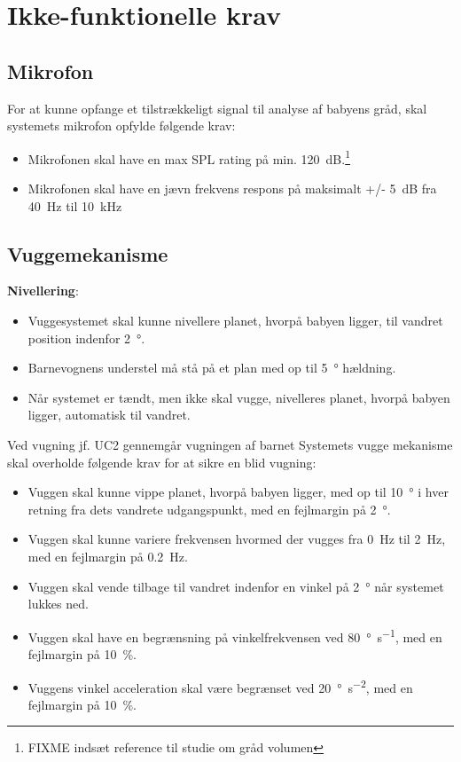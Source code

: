 \section{Ikke-funktionelle krav}

\subsection*{Mikrofon}
For at kunne opfange et tilstrækkeligt signal til analyse af babyens gråd, skal systemets mikrofon opfylde følgende krav:
\begin{itemize}
\item Mikrofonen skal have en max SPL rating på min. \SI{120}{\dB}.\footnote{FIXME indsæt reference til studie om gråd volumen}
\item Mikrofonen skal have en jævn frekvens respons på maksimalt +/- \SI{5}{\dB} fra \SI{40}{\hertz} til \SI{10}{\kilo\hertz}
\end{itemize}

\subsection*{Vuggemekanisme}

\textbf{Nivellering}: \label{kravspec:ikke_funk_nivellering}
\begin{itemize}
	\item Vuggesystemet skal kunne nivellere planet, hvorpå babyen ligger, til vandret position indenfor \SI{2}{\degree}.
	\item Barnevognens understel må stå på et plan med op til \SI{5}{\degree} hældning.
	\item Når systemet er tændt, men ikke skal vugge, nivelleres planet, hvorpå babyen ligger, automatisk til vandret.
\end{itemize}

Ved vugning jf. UC2 gennemgår vugningen af barnet
Systemets vugge mekanisme skal overholde følgende krav for at sikre en blid vugning:
\begin{itemize}
\item Vuggen skal kunne vippe planet, hvorpå babyen ligger, med op til \SI{10}{\degree} i hver retning fra dets vandrete udgangspunkt, med en fejlmargin på \SI{2}{\degree}.
\item Vuggen skal kunne variere frekvensen hvormed der vugges fra \SI{0}{\hertz} til \SI{2}{\hertz}, med en fejlmargin på \SI{0.2}{\hertz}.
\item Vuggen skal vende tilbage til vandret indenfor en vinkel på \SI{2}{\degree} når systemet lukkes ned.
\item Vuggen skal have en begrænsning på vinkelfrekvensen ved \SI{80}{\degree\per\second}, med en fejlmargin på \SI{10}{\percent}.
\item Vuggens vinkel acceleration skal være begrænset ved \SI{20}{\degree\per\square\second}, med en fejlmargin på \SI{10}{\percent}.
\end{itemize}

